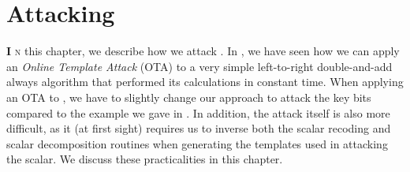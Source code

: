 \chapter{\texorpdfstring{Attacking \fourq}{Attacking FourQ}} \label{chp: Attacking FourQ}
\lettrine[lhang = 0.4, findent=-30pt, lines=4]{\textbf{
		\initfamily \fontsize{20mm}{20mm} \selectfont I
		\normalfont}}{n} 
this chapter, we describe how we attack {\fourq}.
In , we have seen how we can apply an \emph{Online Template Attack} (OTA) to a very simple left-to-right double-and-add always algorithm that performed its calculations in constant time.
When applying an OTA to {\fourq}, we have to slightly change our approach to attack the key bits compared to the example we gave in .
In addition, the attack itself is also more difficult, as it (at first sight) requires us to inverse both the scalar recoding and scalar decomposition routines when generating the templates used in attacking the scalar.
We discuss these practicalities in this chapter.





